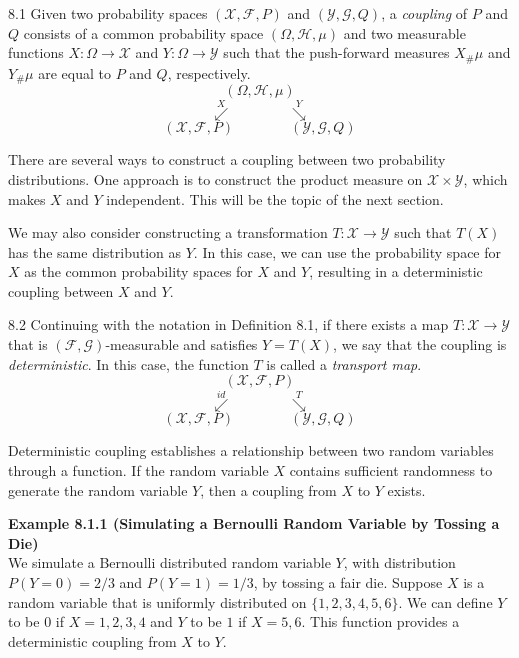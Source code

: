\begin{defbox}{8.1}
Given two probability spaces $(\mathcal{X},\mathcal{F},P)$ and $(\mathcal{Y},\mathcal{G},Q)$, a \textit{coupling} of $P$ and $Q$ consists of a common probability space $(\Omega,\mathcal{H},\mu)$ and two measurable functions $X:\Omega\to \mathcal{X}$ and $Y:\Omega\to \mathcal{Y}$ such that the push-forward measures $X_{\#}\mu$ and $Y_{\#}\mu$ are equal to $P$ and $Q$, respectively.
\[
(\Omega,\mathcal{H},\mu)
\]
\[
\overset{X}{\swarrow} \qquad \qquad \overset{Y}{\searrow}
\]
\[
(\mathcal{X},\mathcal{F},P) \qquad \qquad (\mathcal{Y},\mathcal{G},Q)
\]
\end{defbox}

There are several ways to construct a coupling between two probability distributions. One approach is to construct the product measure on $\mathcal{X}\times \mathcal{Y}$, which makes $X$ and $Y$ independent. This will be the topic of the next section.

We may also consider constructing a transformation $T:\mathcal{X}\to \mathcal{Y}$ such that $T(X)$ has the same distribution as $Y$. In this case, we can use the probability space for $X$ as the common probability spaces for $X$ and $Y$, resulting in a deterministic coupling between $X$ and $Y$.

\begin{defbox}{8.2}
Continuing with the notation in Definition 8.1, if there exists a map $T:\mathcal{X}\to \mathcal{Y}$ that is $(\mathcal{F},\mathcal{G})$-measurable and satisfies $Y=T(X)$, we say that the coupling is \textit{deterministic}. In this case, the function $T$ is called a \textit{transport map}.
\[
(\mathcal{X},\mathcal{F},P)
\]
\[
\overset{id}{\swarrow} \qquad \qquad \overset{T}{\searrow}
\]
\[
(\mathcal{X},\mathcal{F},P) \qquad \qquad (\mathcal{Y},\mathcal{G},Q)
\]
\end{defbox}

Deterministic coupling establishes a relationship between two random variables through a function. If the random variable $X$ contains sufficient randomness to generate the random variable $Y$, then a coupling from $X$ to $Y$ exists.

\textbf{Example 8.1.1 (Simulating a Bernoulli Random Variable by Tossing a Die)} \\
We simulate a Bernoulli distributed random variable $Y$, with distribution $P(Y=0)=2/3$ and $P(Y=1)=1/3$, by tossing a fair die. Suppose $X$ is a random variable that is uniformly distributed on $\{1,2,3,4,5,6\}$. We can define $Y$ to be $0$ if $X=1,2,3,4$ and $Y$ to be $1$ if $X=5,6$. This function provides a deterministic coupling from $X$ to $Y$.


